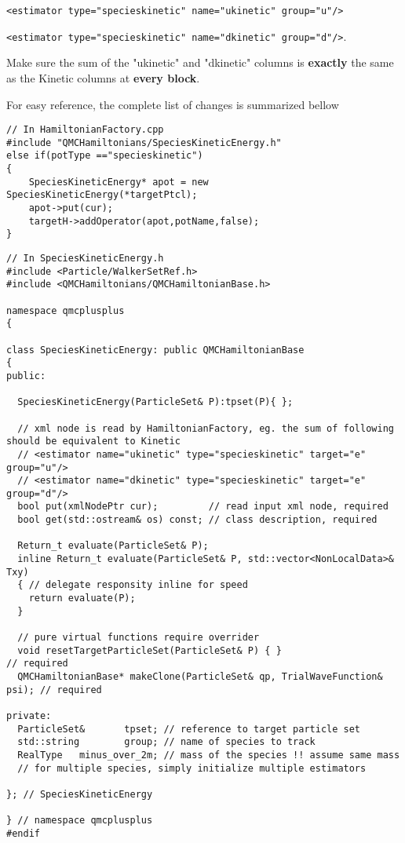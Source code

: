 \documentclass[aps,prl,preprint]{revtex4-1}
\begin{document}
\verb|<estimator type="specieskinetic" name="ukinetic" group="u"/>|

\verb|<estimator type="specieskinetic" name="dkinetic" group="d"/>|.

Make sure the sum of the "ukinetic" and "dkinetic" columns is \textbf{exactly} the same as the Kinetic columns at \textbf{every block}.

For easy reference, the complete list of changes is summarized bellow
\begin{lstlisting}
// In HamiltonianFactory.cpp
#include "QMCHamiltonians/SpeciesKineticEnergy.h"
else if(potType =="specieskinetic")
{
	SpeciesKineticEnergy* apot = new SpeciesKineticEnergy(*targetPtcl);
	apot->put(cur);
	targetH->addOperator(apot,potName,false);
}
\end{lstlisting}
\begin{lstlisting}
// In SpeciesKineticEnergy.h
#include <Particle/WalkerSetRef.h>
#include <QMCHamiltonians/QMCHamiltonianBase.h>

namespace qmcplusplus
{

class SpeciesKineticEnergy: public QMCHamiltonianBase
{
public:

  SpeciesKineticEnergy(ParticleSet& P):tpset(P){ };

  // xml node is read by HamiltonianFactory, eg. the sum of following should be equivalent to Kinetic
  // <estimator name="ukinetic" type="specieskinetic" target="e" group="u"/>
  // <estimator name="dkinetic" type="specieskinetic" target="e" group="d"/>
  bool put(xmlNodePtr cur);         // read input xml node, required
  bool get(std::ostream& os) const; // class description, required
  
  Return_t evaluate(ParticleSet& P);
  inline Return_t evaluate(ParticleSet& P, std::vector<NonLocalData>& Txy)
  { // delegate responsity inline for speed
    return evaluate(P);
  } 
  
  // pure virtual functions require overrider
  void resetTargetParticleSet(ParticleSet& P) { }                         // required
  QMCHamiltonianBase* makeClone(ParticleSet& qp, TrialWaveFunction& psi); // required
  
private:
  ParticleSet&       tpset; // reference to target particle set
  std::string        group; // name of species to track
  RealType   minus_over_2m; // mass of the species !! assume same mass
  // for multiple species, simply initialize multiple estimators
  
}; // SpeciesKineticEnergy

} // namespace qmcplusplus
#endif
\end{lstlisting}
\end{document}
